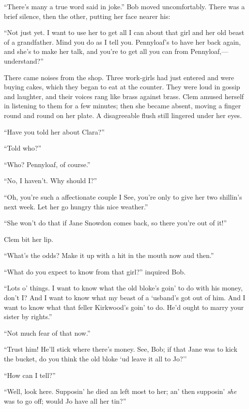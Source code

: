 ``There's many a true word said in joke.'' Bob moved uncomfortably.
There was a brief silence, then the other, putting her face nearer his:

``Not just yet. I want to use her to get all I can about that girl and
her old beast of a grandfather. Mind you do as I tell you. Pennyloaf's
to have her back again, and she's to make her talk, and you're to get
all you can from Pennyloaf,---understand?''

There came noises from the shop. Three work-girls had just entered and
were buying {\protect\hypertarget{33}{}{}}cakes, which they began to eat
at the counter. They were loud in gossip and laughter, and their voices
rang like brass against brass. Clem amused herself in listening to them
for a few minutes; then she became absent, moving a finger round and
round on her plate. A disagreeable flush still lingered under her eyes.

``Have you told her about Clara?''

``Told who?''

``Who? Pennyloaf, of course.''

``No, I haven't. Why should I?''

``Oh, you're such a affectionate couple I See, you're only to give her
two shillin's next week. Let her go hungry this nice weather.''

``She won't do that if Jane Snowdon comes back, so there you're out of
it!''

Clem bit her lip.

``What's the odds? Make it up with a hit in the mouth now aud then.''

``What do you expect to know from that girl?'' inquired Bob.

``Lots o' things. I want to know what the old bloke's goin' to do with
his money, don't I? And I want to know what my beast of a `usband's got
out of him. And I want to know what that feller Kirkwood's goin' to
{\protect\hypertarget{34}{}{}}do. He'd ought to marry your sister by
rights.''

``Not much fear of that now.''

``Trust him! He'll stick where there's money. See, Bob; if that Jane was
to kick the bucket, do you think the old bloke `ud leave it all to Jo?''

``How can I tell?''

``Well, look here. Supposin' he died an left most to her; an' then
supposin' \emph{she} was to go off; would Jo have all her tin?''

